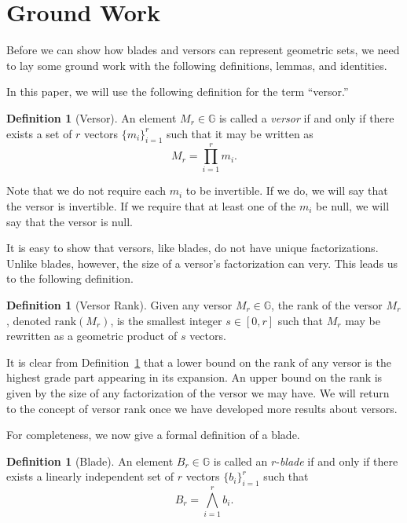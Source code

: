 \documentclass{birkjour}
\theoremstyle{definition}
\newtheorem{defn}[thm]{Definition}
\theoremstyle{remark}
\numberwithin{equation}{section}
\newcommand{\G}{\mathbb{G}}
\newcommand{\rank}{\mbox{rank}}
\begin{document}
\section{Ground Work}

Before we can show how blades and versors can represent geometric sets, we need to lay some ground work
with the following definitions, lemmas, and identities.

In this paper, we will use the following definition for the term ``versor.''
\begin{defn}[Versor]
An element $M_r\in\G$ is called a \emph{versor} if and only if there exists a set of $r$ vectors $\{m_i\}_{i=1}^r$
such that it may be written as
\begin{equation}\label{equ_M_r}
M_r = \prod_{i=1}^r m_i.
\end{equation}
\end{defn}
Note that we do not require each $m_i$ to be invertible.  If we do, we will say that the
versor is invertible.  If we require that at least one of the $m_i$ be null, we will say that
the versor is null.

It is easy to show that versors, like blades, do not have unique factorizations.  Unlike blades, however, the
size of a versor's factorization can very.  This leads us to the following definition.
\begin{defn}[Versor Rank]\label{def_versor_rank}
Given any versor $M_r\in\G$, the rank of the versor $M_r$, denoted $\rank(M_r)$, is the
smallest integer $s\in[0,r]$ such that $M_r$ may be rewritten as a geometric product of $s$ vectors.
\end{defn}

It is clear from Definition~\ref{def_versor_rank} that a lower bound on the rank of any versor
is the highest grade part appearing in its expansion.  An upper bound on the rank is given by
the size of any factorization of the versor we may have.  We will return to the concept of versor
rank once we have developed more results about versors.

For completeness, we now give a formal definition of a blade.
\begin{defn}[Blade]
An element $B_r\in\G$ is called an $r$-\emph{blade} if and only if there exists a linearly independent set of $r$
vectors $\{b_i\}_{i=1}^r$ such that
\begin{equation}\label{equ_B_r}
B_r = \bigwedge_{i=1}^r b_i.
\end{equation}
\end{defn}
\end{document}
